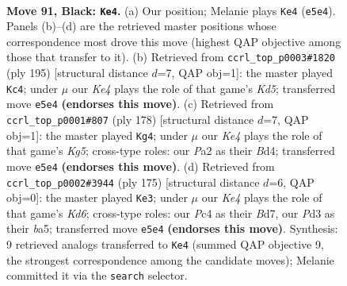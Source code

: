 \documentclass[11pt]{article}
\begin{document}
\clearpage

\begin{figure}[p]\centering
\begin{subfigure}{0.46\textwidth}\centering
\resizebox{\linewidth}{!}{%
\newchessgame
\chessboard[
  setfen={8/8/8/4k3/2p5/3p2K1/p7/8 b - - 1 91},
  showmover=false,
  pgfstyle=straightmove, color=movearrow, markmove={e5-e4}
]}
\caption{}
\end{subfigure}\hfill
\begin{subfigure}{0.46\textwidth}\centering
\resizebox{\linewidth}{!}{%
\newchessgame
\chessboard[
  setfen={8/8/8/p7/Pp1k4/5B2/3K4/8 b - - 50 98},
  showmover=false,
  pgfstyle=straightmove, color=movearrow, markmove={d4-c4}
]}
\caption{}
\end{subfigure}
\\[4pt]
\begin{subfigure}{0.46\textwidth}\centering
\resizebox{\linewidth}{!}{%
\newchessgame
\chessboard[
  setfen={8/8/4k3/1b4K1/3BP3/5P2/8/8 w - - 3 90},
  showmover=false,
  pgfstyle=straightmove, color=movearrow, markmove={g5-g4}
]}
\caption{}
\end{subfigure}\hfill
\begin{subfigure}{0.46\textwidth}\centering
\resizebox{\linewidth}{!}{%
\newchessgame
\chessboard[
  setfen={8/3b4/8/B6p/5p2/3k4/8/6K1 b - - 23 88},
  showmover=false,
  pgfstyle=straightmove, color=movearrow, markmove={d3-e3}
]}
\caption{}
\end{subfigure}
\caption{\textbf{Move 91, Black: \texttt{Ke4}.} (a) Our position; Melanie plays \texttt{Ke4} (\texttt{e5e4}). Panels (b)--(d) are the retrieved master positions whose correspondence most drove this move (highest QAP objective among those that transfer to it). (b) Retrieved from \texttt{ccrl\_top\_p0003\#1820} (ply 195) [structural distance $d$=7, QAP obj=1]: the master played \texttt{Kc4}; under $\mu$ our \emph{Ke4} plays the role of that game's \emph{Kd5}; transferred move \texttt{e5e4} \textbf{(endorses this move)}. (c) Retrieved from \texttt{ccrl\_top\_p0001\#807} (ply 178) [structural distance $d$=7, QAP obj=1]: the master played \texttt{Kg4}; under $\mu$ our \emph{Ke4} plays the role of that game's \emph{Kg5}; cross-type roles: our \emph{P}a2 as their \emph{B}d4; transferred move \texttt{e5e4} \textbf{(endorses this move)}. (d) Retrieved from \texttt{ccrl\_top\_p0002\#3944} (ply 175) [structural distance $d$=6, QAP obj=0]: the master played \texttt{Ke3}; under $\mu$ our \emph{Ke4} plays the role of that game's \emph{Kd6}; cross-type roles: our \emph{P}c4 as their \emph{B}d7, our \emph{P}d3 as their \emph{b}a5; transferred move \texttt{e5e4} \textbf{(endorses this move)}. Synthesis: 9 retrieved analogs transferred to \texttt{Ke4} (summed QAP objective 9, the strongest correspondence among the candidate moves); Melanie committed it via the \texttt{search} selector.}
\label{fig:thought-m181}
\end{figure}
\end{document}
